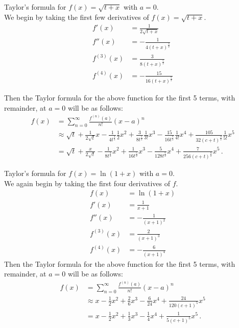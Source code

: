 \documentclass[12pt]{book}
\newenvironment{exercise}[2][Exercise]{\begin{trivlist}
\item[\hskip \labelsep {\bfseries #1}\hskip \labelsep {\bfseries #2.}]}{\end{trivlist}}
\begin{document}
\begin{exercise}{6.5.5}
Taylor's formula for $f(x) = \sqrt{ t+x}$ with $a=0$. \\

We begin by taking the first few derivatives of $f(x) = \sqrt{t+x}$.
    \begin{align*}
    f'(x) &= \frac{1}{2 \sqrt{t + x}} \\
    f''(x) &= - \frac{1}{4 \left(t + x\right)^{\frac{3}{2}}} \\
    f^{(3)} (x) &= \frac{3}{8 \left(t + x\right)^{\frac{5}{2}}} \\
    f^{(4)} (x) &= - \frac{15}{16 \left(t + x\right)^{\frac{7}{2}}}
    \end{align*}

    Then the Taylor formula for the above function for the first 5 terms, with remainder, at $a=0$ will be as follows:
    \begin{align*}
    f(x) &= \sum_{n=0}^\infty \frac{f^{(n)}(a)}{n!} (x-a)^n \\
    &\approx \sqrt{t} + \frac{1}{2 \sqrt{t}} x - \frac{1}{4 t^{\frac{3}{2}}}\frac{1}{2} x^2 + \frac{3}{8 t^{\frac{5}{2}}}  \frac{1}{3!}  x^3 - \frac{15}{16 t^{\frac{7}{2}}} \frac{1}{4!}  x^4 + \frac{105}{32 \left(c + t\right)^{\frac{9}{2}}} \frac{1}{5!} x^5 \\
    &= \sqrt{t} + \frac{x}{2 \sqrt{t}} - \frac{1}{8 t^{\frac{3}{2}}} x^2 + \frac{1}{16 t^\frac{5}{2}} x^3 - \frac{5}{128 t^\frac{7}{2}} x^4 + \frac{7}{256 \left(c+t\right)^\frac{9}{2}} x^5 \,.
    \end{align*}
\end{exercise}




\begin{exercise}{6.5.7}
Taylor's formula for $f(x) =\ln (1+x)$ with $a=0$.  \\

We again begin by taking the first four derivatives of $f$.
    \begin{align*}
    f(x) &= \ln (1+x) \\
    f'(x) &= \frac{1}{x + 1} \\
    f''(x) &= - \frac{1}{\left(x + 1\right)^{2}} \\
    f^{(3)} (x) &= \frac{2}{\left(x + 1\right)^{3}} \\
    f^{(4)} (x) &= - \frac{6}{\left(x + 1\right)^{4}}
    \end{align*}
    Then the Taylor formula for the above function for the first 5 terms, with remainder, at $a=0$ will be as follows:
    \begin{align*}
    f(x) &= \sum_{n=0}^\infty \frac{f^{(n)}(a)}{n!} (x-a)^n \\
    &\approx x - \frac{1}{2} x^2 + \frac{2}{6} x^3 - \frac{6}{24} x^4 + \frac{24}{120\left(c+1\right)^5} x^5 \\
    &= x - \frac{1}{2} x^2 + \frac{1}{3} x^3 - \frac{1}{4} x^4 + \frac{1}{5 \left(c+1\right)^5} x^5 \,.
    \end{align*}
\end{exercise}
\end{document}
